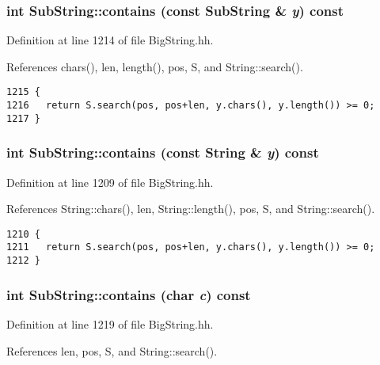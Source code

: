 \subsubsection{\setlength{\rightskip}{0pt plus 5cm}int Sub\-String::contains (const Sub\-String \& {\em y}) const\hspace{0.3cm}{\tt  [inline]}}\label{classSubString_a7}




Definition at line 1214 of file Big\-String.hh.

References chars(), len, length(), pos, S, and String::search().



\footnotesize\begin{verbatim}1215 {   
1216   return S.search(pos, pos+len, y.chars(), y.length()) >= 0;
1217 }
\end{verbatim}\normalsize 
{}
\subsubsection{\setlength{\rightskip}{0pt plus 5cm}int Sub\-String::contains (const {\bf String} \& {\em y}) const\hspace{0.3cm}{\tt  [inline]}}\label{classSubString_a6}




Definition at line 1209 of file Big\-String.hh.

References String::chars(), len, String::length(), pos, S, and String::search().



\footnotesize\begin{verbatim}1210 {   
1211   return S.search(pos, pos+len, y.chars(), y.length()) >= 0;
1212 }
\end{verbatim}\normalsize 
{}
\subsubsection{\setlength{\rightskip}{0pt plus 5cm}int Sub\-String::contains (char {\em c}) const\hspace{0.3cm}{\tt  [inline]}}\label{classSubString_a5}




Definition at line 1219 of file Big\-String.hh.

References len, pos, S, and String::search().



